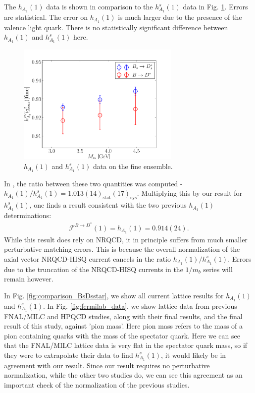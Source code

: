 The $h_{A_1}(1)$ data is shown in comparison to the $h_{A_1}^s(1)$ data in Fig. \ref{fig:BDstar_BsDsstar}. Errors are statistical. The error on $h_{A_1}(1)$ is much larger due to the presence of the valence light quark. There is no statistically significant difference between $h_{A_1}(1)$ and $h_{A_1}^s(1)$ here.

\begin{figure}[htb!]
  \begin{center}
  \hspace{-10pt}
  \includegraphics[width=0.7\textwidth]{images/BsDsstar/BD_BsDs.pdf}
  \caption{$h_{A_1}(1)$ and $h_{A_1}^s(1)$ data on the fine ensemble.\label{fig:BDstar_BsDsstar}}
  \end{center}
\end{figure}

In \cite{Harrison:2017fmw}, the ratio between these two quantities was computed - $h_{A_1}(1) / h^s_{A_1}(1) = 1.013(14)_{\text{stat}}(17)_{\text{sys}}$. Multiplying this by our result for $h^s_{A_1}(1)$, one finds a result consistent with the two previous $h_{A_1}(1)$ determinations:
\begin{align}
  \mathcal{F}^{B\to D^*}(1) = h_{A_1}(1) = 0.914(24).
  \label{eq:hA1_us_nrqcd}
\end{align}
While this result does rely on NRQCD, it in principle suffers from much smaller perturbative matching errors. This is because the overall normalization of the axial vector NRQCD-HISQ current cancels in the ratio $h_{A_1}(1) / h^s_{A_1}(1)$. Errors due to the truncation of the NRQCD-HISQ currents in the $1/m_b$ series will remain however.

In Fig. \ref{fig:comparison_BsDsstar}, we show all current lattice results for $h_{A_1}(1)$ and $h_{A_1}^s(1)$. In Fig. \ref{fig:fermilab_data}, we show lattice data from previous FNAL/MILC and HPQCD studies, along with their final results, and the final result of this study, against 'pion mass'. Here pion mass refers to the mass of a pion containing quarks with the mass of the spectator quark. Here we can see that the FNAL/MILC lattice data is very flat in the spectator quark mass, so if they were to extrapolate their data to find $h^s_{A_1}(1)$, it would likely be in agreement with our result. Since our result requires no perturbative normalization, while the other two studies do, we can see this agreement as an important check of the normalization of the previous studies.

